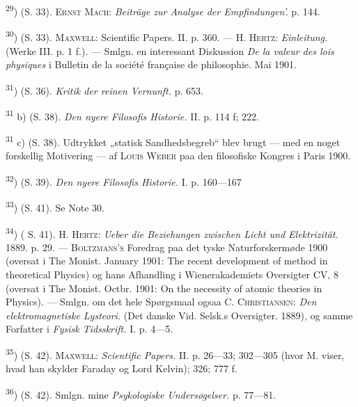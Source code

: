 \documentclass[12pt,a4paper,openany]{book}
\newcommand{\opage}[1]{\marginnote{\footnotesize\textit{[#1]}}}
\begin{document}
\begin{small}
\textsuperscript{29}) (S. 33). \textsc{Ernst Mach}: \textit{Beiträge zur
Analyse der Empfindungen'.} p. 144.

\textsuperscript{30}) (S. 33). \textsc{Maxwell}: Scientific Papers. II. p. 360.
--- \textsc{H. Hertz}: \textit{Einleitung.} (Werke III. p. 1 f.). --- Smlgn. en
interessant Diskussion \textit{De la valeur des lois physiques} i Bulletin de
la société française de philosophie. Mai 1901.

\textsuperscript{31}) (S. 36). \textit{Kritik der reinen Vernunft.} p. 653.

\textsuperscript{31} b) (S. 38). \textit{Den nyere Filosofis Historie.} II. p.
114 f; 222.

\textsuperscript{31} c) (S. 38). Udtrykket „statisk Sandhedsbegreb“ blev brugt
--- med en noget forskellig Motivering --- af \textsc{Louis Weber} paa den
filosofiske Kongres i Paris 1900.

\textsuperscript{32}) (S. 39). \textit{Den nyere Filosofis Historie.} I. p. 160---167

\textsuperscript{33}) (S. 41). Se Note 30.

\textsuperscript{34}) (
\opage{88}S. 41). \textsc{H. Hertz}: \textit{Ueber die Beziehungen zwischen
Licht und Elektrizität.} 1889. p. 29. --- \textsc{Boltzmans's} Foredrag paa det
tyske Naturforskermøde 1900 (oversat i The Monist. January 1901: The recent
development of method in theoretical Physics) og hans Afhandling i
Wienerakademiets Oversigter CV, 8 (oversat i The Monist. Octbr. 1901: On the
necessity of atomic theories in Physics). --- Smlgn. om det hele Spørgsmaal
ogsaa \textsc{C. Christiansen}: \textit{Den elektromagnetiske Lysteori.} (Det
danske Vid. Selsk.s Oversigter. 1889), og samme Forfatter i \textit{Fysisk
Tidsskrift.} I. p. 4---5.

\textsuperscript{35}) (S. 42). \textsc{Maxwell}: \textit{Scientific Papers.}
II. p. 26---33; 302---305 (hvor M. viser, hvad han skylder Faraday og Lord
Kelvin); 326; 777 f.

\textsuperscript{36}) (S. 42). Smlgn. mine \textit{Psykologiske Undersøgelser.}
p. 77---81.


\end{small}
\end{document}
